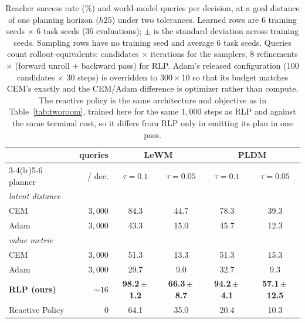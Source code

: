 \begin{table}[t]
\centering
\caption{Reacher success rate (\%) and world-model queries per decision, at a
goal distance of one planning horizon ($h25$) under two tolerances. Learned rows
are $6$ training seeds $\times$ $6$ task seeds ($36$ evaluations); $\pm$ is the
standard deviation across training seeds. Sampling rows have no training seed
and average $6$ task seeds. Queries count rollout-equivalents: candidates
$\times$ iterations for the samplers, $8$ refinements $\times$ (forward unroll
$+$ backward pass) for RLP. Adam's released configuration ($100$ candidates
$\times$ $30$ steps) is overridden to $300\times10$ so that its budget matches
CEM's exactly and the CEM/Adam difference is optimizer rather than compute. The
reactive policy is the same architecture and objective as in
Table~\ref{tab:tworoom}, trained here for the same $1{,}000$ steps as RLP and
against the same terminal cost, so it differs from RLP only in emitting its plan
in one pass.}
\label{tab:reacher}
\begin{tabular}{lrcccc}
\toprule
& queries & \multicolumn{2}{c}{LeWM} & \multicolumn{2}{c}{PLDM} \\
\cmidrule(lr){3-4}\cmidrule(lr){5-6}
planner & / dec. & $\tau{=}0.1$ & $\tau{=}0.05$ & $\tau{=}0.1$ & $\tau{=}0.05$ \\
\midrule
\multicolumn{6}{l}{\emph{latent distance}} \\
\quad CEM  & $3{,}000$ & 84.3 & 44.7 & 78.3 & 39.3 \\
\quad Adam & $3{,}000$ & 43.3 & 15.0 & 45.7 & 12.3 \\
\midrule
\multicolumn{6}{l}{\emph{value metric}} \\
\quad CEM  & $3{,}000$ & 51.3 & 13.3 & 51.3 & 15.3 \\
\quad Adam & $3{,}000$ & 29.7 & \phantom{0}9.0 & 32.7 & \phantom{0}9.3 \\
\quad \textbf{RLP (ours)} & ${\sim}16$ & \textbf{98.2\,$\pm$\,1.2} & \textbf{66.3\,$\pm$\,8.7} & \textbf{94.2\,$\pm$\,4.1} & \textbf{57.1\,$\pm$\,12.5} \\
\quad Reactive Policy & $0$ & 64.1 & 35.0 & 20.4 & 10.3 \\
\bottomrule
\end{tabular}
\end{table}

